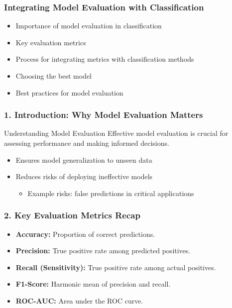 \documentclass[aspectratio=169]{beamer}
\begin{document}
\begin{frame}[fragile]
    \frametitle{Integrating Model Evaluation with Classification}
    \begin{itemize}
        \item Importance of model evaluation in classification
        \item Key evaluation metrics
        \item Process for integrating metrics with classification methods
        \item Choosing the best model
        \item Best practices for model evaluation
    \end{itemize}
\end{frame}

\begin{frame}[fragile]
    \frametitle{1. Introduction: Why Model Evaluation Matters}
    \begin{block}{Understanding Model Evaluation}
        Effective model evaluation is crucial for assessing performance and making informed decisions.
    \end{block}
    
    \begin{itemize}
        \item Ensures model generalization to unseen data
        \item Reduces risks of deploying ineffective models
        \begin{itemize}
            \item Example risks: false predictions in critical applications
        \end{itemize}
    \end{itemize}
\end{frame}

\begin{frame}[fragile]
    \frametitle{2. Key Evaluation Metrics Recap}
    \begin{itemize}
        \item \textbf{Accuracy:} Proportion of correct predictions.
        \item \textbf{Precision:} True positive rate among predicted positives.
        \item \textbf{Recall (Sensitivity):} True positive rate among actual positives.
        \item \textbf{F1-Score:} Harmonic mean of precision and recall.
        \item \textbf{ROC-AUC:} Area under the ROC curve.
    \end{itemize}
\end{frame}
\end{document}
